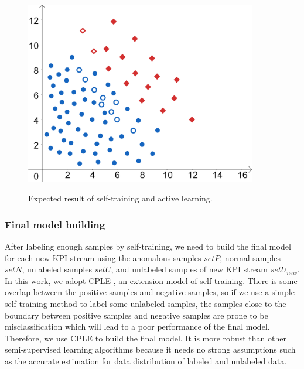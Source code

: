\begin{figure}
  \setlength{\belowcaptionskip}{0cm}
  \begin{minipage}[H]{1.0\linewidth}
  \centering
  \includegraphics[width=0.9\textwidth]{ADS_Journal/PU figures/final_1.png}\\
  \end{minipage}
  \caption{Expected result of self-training and active learning.}
  \label{fig:expected result}
\end{figure}

\subsubsection{Final model building}
\label{subsubsubsec:Pre-training}
After labeling enough samples by self-training, we need to build the final model for each new KPI stream using the anomalous samples $setP$, normal samples $setN$, unlabeled samples $setU$, and unlabeled samples of new KPI stream $setU_{new}$. In this work, we adopt CPLE \cite{loog2016contrastive}, an extension model of self-training. There is some overlap between the positive samples and negative samples, so if we use a simple self-training method to label some unlabeled samples, the samples close to the boundary between positive samples and negative samples are prone to be misclassification which will lead to a poor performance of the final model.
Therefore, we use CPLE to build the final model. It is more robust than other semi-supervised learning algorithms because it needs no strong assumptions such as the accurate estimation for data distribution of labeled and unlabeled data.
